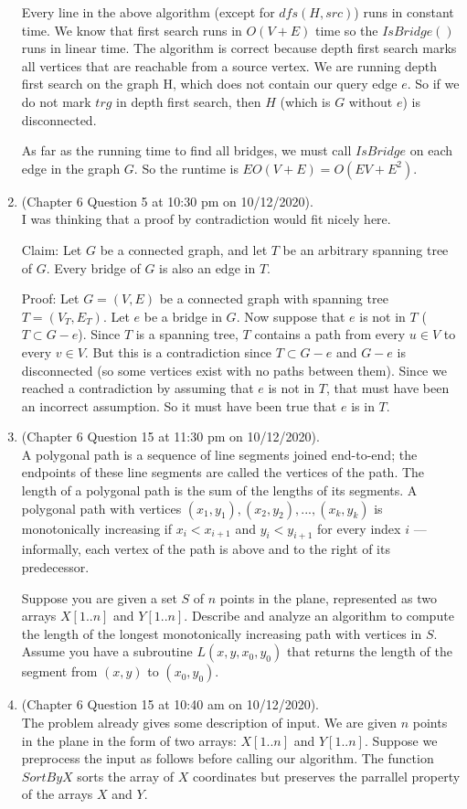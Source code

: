 \documentclass{article}
\begin{document}
\begin{enumerate}
        Every line in the above algorithm (except for $dfs(H, src)$) runs in constant time. We know that first search runs in $O(V + E)$ time so the $IsBridge()$ runs in linear time. The algorithm is correct because depth first search marks all vertices that are reachable from a source vertex. We are running depth first search on the graph H, which does not contain our query edge $e$. So if we do not mark $trg$ in depth first search, then $H$ (which is $G$ without $e$) is disconnected.

        As far as the running time to find all bridges, we must call $IsBridge$ on each edge in the graph $G$. So the runtime is $EO(V + E) = O(EV + E^2)$.
    \item (Chapter 6 Question 5 at 10:30 pm on 10/12/2020). \\
        I was thinking that a proof by contradiction would fit nicely here.

        Claim: Let $G$ be a connected graph, and let $T$ be an arbitrary spanning tree of $G$.
        Every bridge of $G$ is also an edge in $T$.

        Proof: Let $G = (V, E)$ be a connected graph with spanning tree $T = (V_T, E_T)$.
        Let $e$ be a bridge in $G$.
        Now suppose that $e$ is not in $T$ ($T \subset G - e$).
        Since $T$ is a spanning tree, $T$ contains a path from every $u \in V$ to every $v \in V$.
        But this is a contradiction since $T \subset G - e$ and $G- e$ is disconnected (so some vertices exist with no paths between them).
        Since we reached a contradiction by assuming that $e$ is not in $T$, that must have been an incorrect assumption.
        So it must have been true that $e$ is in $T$.
    \item (Chapter 6 Question 15 at 11:30 pm on 10/12/2020). \\
        A polygonal path is a sequence of line segments joined end-to-end; the endpoints of these line segments are called the vertices of the path.
        The length of a polygonal path is the sum of the lengths of its segments.
        A polygonal path with vertices $(x_1, y_1), (x_2, y_2), ... ,(x_k, y_k)$ is monotonically increasing if $x_i < x_{i+1}$ and $y_i < y_{i+1}$ for every index $i$ --- informally, each vertex of the path is above and to the right of its predecessor.

        Suppose you are given a set $S$ of $n$ points in the plane, represented as two arrays $X[1 .. n]$ and $Y [1 .. n]$.
        Describe and analyze an algorithm to compute the length of the longest monotonically increasing path with vertices in $S$.
        Assume you have a subroutine $L(x, y, x_0, y_0)$ that returns the length of the segment from $(x, y)$ to $(x_0, y_0)$.
    \item (Chapter 6 Question 15 at 10:40 am on 10/12/2020). \\
        The problem already gives some description of input.
        We are given $n$ points in the plane in the form of two arrays: $X[1..n]$ and $Y[1..n]$.
        Suppose we preprocess the input as follows before calling our algorithm.
        The function $SortByX$ sorts the array of $X$ coordinates but preserves the parrallel property of the arrays $X$ and $Y$.


\end{enumerate}
\end{document}
